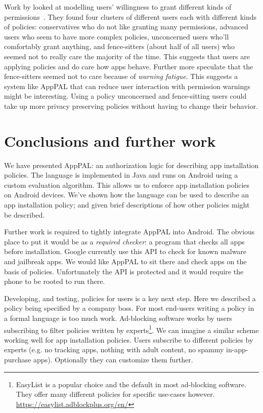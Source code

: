 \documentclass[twoside,letterpaper]{soups}
\newcommand{\comment}[1]{}%
\begin{document}
Work by \citeauthor{Sadeh:2014vq} looked at modelling users' willingness to grant different kinds of permissions~\citep{Sadeh:2014vq}.
They found four clusters of different users each with different kinds of policies:
  conservatives who do not like granting many permissions,
  advanced users who seem to have more complex policies,
  unconcerned users who'll comfortably grant anything,
  and fence-sitters (about half of all users) who seemed not to really care the majority of the time.
This suggests that users are applying policies and do care how apps behave.
Further more \citeauthor{Sadeh:2014vq} speculate that the fence-sitters seemed not to care because of \emph{warning fatigue}.
This suggests a system like AppPAL that can reduce user interaction with permission warnings might be interesting.
Using a policy unconcerned and fence-sitting users could take up more privacy preserving policies without having to change their behavior.

\section{Conclusions and further work \comment{$\frac{1}{2}$ page}}

We have presented AppPAL: an authorization logic for describing app installation policies.
The language is implemented in Java and runs on Android using a custom evaluation algorithm.
This allows us to enforce app installation policies on Android devices.
We've shown how the language can be used to describe an app installation policy;
  and given brief descriptions of how other policies might be described.

Further work is required to tightly integrate AppPAL into Android.
The obvious place to put it would be as a \emph{required checker}: a program that checks all apps before installation.
Google currently use this API to check for known malware and jailbreak apps.
We would like AppPAL to sit there and check apps on the basis of policies.
Unfortunately the API is protected and it would require the phone to be rooted to run there.

Developing, and testing, policies for users is a key next step.
Here we described a policy being specified by a company boss.
For most end-users writing a policy in a formal language is too much work.
Ad-blocking software works by users subscribing to filter policies written by experts\footnote{EasyList is a popular choice and the default in most ad-blocking software. They offer many different policies for specific use-cases however. \url{https://easylist.adblockplus.org/en/}}.
We can imagine a similar scheme working well for app installation policies.
Users subscribe to different policies by experts (e.g. no tracking apps, nothing with adult content, no spammy in-app-purchase apps).
Optionally they can customize them further.
\end{document}
